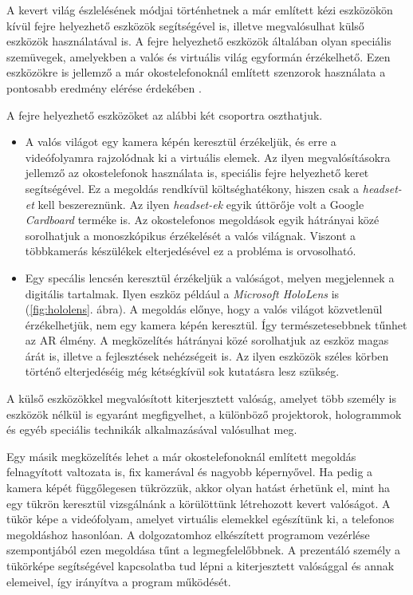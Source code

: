 A kevert világ észlelésének módjai történhetnek a már említett kézi eszközökön kívül fejre helyezhető eszközök segítségével is, illetve megvalósulhat külső eszközök használatával is.
A fejre helyezhető eszközök általában olyan speciális szemüvegek, amelyekben a valós és virtuális világ egyformán érzékelhető. Ezen eszközökre is jellemző a már okostelefonoknál említett szenzorok használata a pontosabb eredmény elérése érdekében \cite{surgical2018ar}.

A fejre helyezhető eszközöket az alábbi két csoportra oszthatjuk.
\begin{itemize}
	\item A valós világot egy kamera képén keresztül érzékeljük, és erre a videófolyamra rajzolódnak ki a virtuális elemek. Az ilyen megvalósításokra jellemző az okostelefonok használata is, speciális fejre helyezhető keret segítségével. Ez a megoldás rendkívül költséghatékony, hiszen csak a \textit{headset-et} kell beszereznünk. Az ilyen \textit{headset-ek} egyik úttörője volt a Google \textit{Cardboard} terméke is. Az okostelefonos megoldások egyik hátrányai közé sorolhatjuk a monoszkópikus érzékelését a valós világnak. Viszont a többkamerás készülékek elterjedésével ez a probléma is orvosolható.
	
	\item Egy specális lencsén keresztül érzékeljük a valóságot, melyen megjelennek a digitális tartalmak. Ilyen eszköz például a \textit{Microsoft HoloLens} is (\ref{fig:hololens}. ábra). A megoldás előnye, hogy a valós világot közvetlenül érzékelhetjük, nem egy kamera képén keresztül. Így természetesebbnek tűnhet az AR élmény. A megközelítés hátrányai közé sorolhatjuk az eszköz magas árát is, illetve a fejlesztések nehézségeit is. Az ilyen eszközök széles körben történő elterjedéséig még kétségkívül sok kutatásra lesz szükség.
\end{itemize}

A külső eszközökkel megvalósított kiterjesztett valóság, amelyet több személy is eszközök nélkül is egyaránt megfigyelhet, a különböző projektorok, hologrammok és egyéb speciális technikák alkalmazásával valósulhat meg.

Egy másik megközelítés lehet a már okostelefonoknál említett megoldás felnagyított valtozata is, fix kamerával és nagyobb képernyővel. Ha pedig a kamera képét függőlegesen tükrözzük, akkor olyan hatást érhetünk el, mint ha egy tükrön keresztül vizsgálnánk a körülöttünk létrehozott kevert valóságot. A tükör képe a videófolyam, amelyet virtuális elemekkel egészítünk ki, a telefonos megoldáshoz hasonlóan.
A dolgozatomhoz elkészített programom vezérlése szempontjából ezen megoldása tűnt a legmegfelelőbbnek. A prezentáló személy a tükörképe segítségével kapcsolatba tud lépni a kiterjesztett valósággal és annak elemeivel, így irányítva a program működését.

